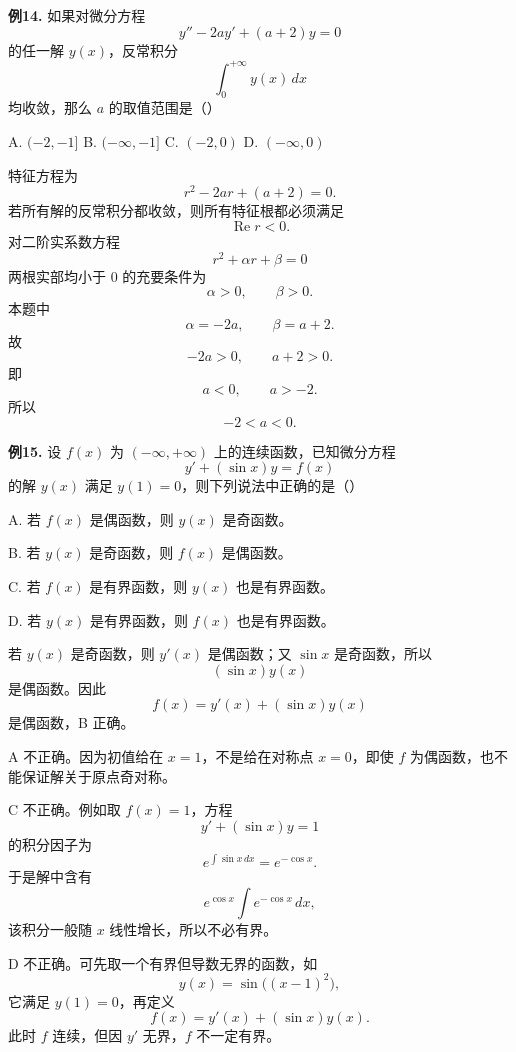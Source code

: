 \begin{problemblock}
\textbf{例14.} 如果对微分方程
\[
y''-2ay'+(a+2)y=0
\]
的任一解 \(y(x)\)，反常积分
\[
\int_0^{+\infty}y(x)\,dx
\]
均收敛，那么 \(a\) 的取值范围是（\quad）

A. \((-2,-1]\)
\quad B. \((-\infty,-1]\)
\quad C. \((-2,0)\)
\quad D. \((-\infty,0)\)
\end{problemblock}
\begin{solutionblock}
特征方程为
\[
r^2-2ar+(a+2)=0.
\]
若所有解的反常积分都收敛，则所有特征根都必须满足
\[
\operatorname{Re}r<0.
\]
对二阶实系数方程
\[
r^2+\alpha r+\beta=0
\]
两根实部均小于 \(0\) 的充要条件为
\[
\alpha>0,\qquad \beta>0.
\]
本题中
\[
\alpha=-2a,\qquad \beta=a+2.
\]
故
\[
-2a>0,\qquad a+2>0.
\]
即
\[
a<0,\qquad a>-2.
\]
所以
\[
-2<a<0.
\]
\end{solutionblock}

\begin{problemblock}
\textbf{例15.} 设 \(f(x)\) 为 \((-\infty,+\infty)\) 上的连续函数，已知微分方程
\[
y'+(\sin x)y=f(x)
\]
的解 \(y(x)\) 满足 \(y(1)=0\)，则下列说法中正确的是（\quad）

A. 若 \(f(x)\) 是偶函数，则 \(y(x)\) 是奇函数。

B. 若 \(y(x)\) 是奇函数，则 \(f(x)\) 是偶函数。

C. 若 \(f(x)\) 是有界函数，则 \(y(x)\) 也是有界函数。

D. 若 \(y(x)\) 是有界函数，则 \(f(x)\) 也是有界函数。
\end{problemblock}
\begin{solutionblock}
若 \(y(x)\) 是奇函数，则 \(y'(x)\) 是偶函数；又 \(\sin x\) 是奇函数，所以
\[
(\sin x)y(x)
\]
是偶函数。因此
\[
f(x)=y'(x)+(\sin x)y(x)
\]
是偶函数，B 正确。

A 不正确。因为初值给在 \(x=1\)，不是给在对称点 \(x=0\)，即使 \(f\) 为偶函数，也不能保证解关于原点奇对称。

C 不正确。例如取 \(f(x)=1\)，方程
\[
y'+(\sin x)y=1
\]
的积分因子为
\[
e^{\int\sin x\,dx}=e^{-\cos x}.
\]
于是解中含有
\[
e^{\cos x}\int e^{-\cos x}\,dx,
\]
该积分一般随 \(x\) 线性增长，所以不必有界。

D 不正确。可先取一个有界但导数无界的函数，如
\[
y(x)=\sin\bigl((x-1)^2\bigr),
\]
它满足 \(y(1)=0\)，再定义
\[
f(x)=y'(x)+(\sin x)y(x).
\]
此时 \(f\) 连续，但因 \(y'\) 无界，\(f\) 不一定有界。
\end{solutionblock}

